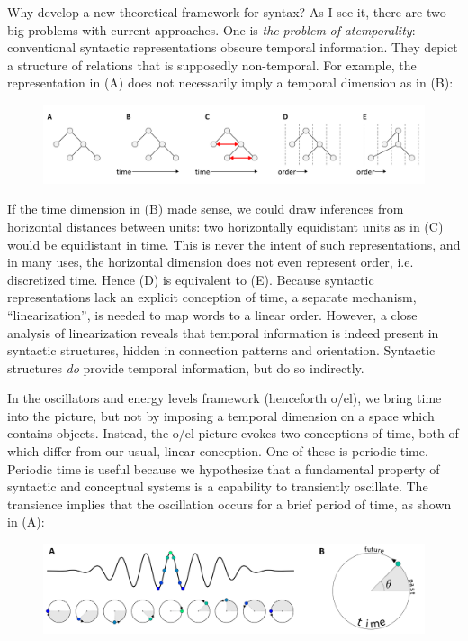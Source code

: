 Why develop a new theoretical framework for syntax? As I see it, there are two big problems with current approaches. One is \textit{the} \textit{problem} \textit{of} \textit{atemporality}: conventional syntactic representations obscure temporal information. They depict a structure of relations that is supposedly non-temporal. For example, the representation in (A) does not necessarily imply a temporal dimension as in (B): 

  
\begin{figure}
\includegraphics[width=\textwidth]{figures/Tilsen-img1.png}
\caption{\missingcaption}
\label{fig:}
\end{figure}
 

  If the time dimension in (B) made sense, we could draw inferences from horizontal distances between units: two horizontally equidistant units as in (C) would be equidistant in time. This is never the intent of such representations, and in many uses, the horizontal dimension does not even represent order, i.e. discretized time. Hence (D) is equivalent to (E). Because syntactic representations lack an explicit conception of time, a separate mechanism, “linearization”, is needed to map words to a linear order.  However, a close analysis of linearization reveals that temporal information is indeed present in syntactic structures, hidden in connection patterns and orientation. Syntactic structures \textit{do} provide temporal information, but do so indirectly.

  In the oscillators and energy levels framework (henceforth o/el), we bring time into the picture, but not by imposing a temporal dimension on a space which contains objects. Instead, the o/el picture evokes two conceptions of time, both of which differ from our usual, linear conception. One of these is periodic time. Periodic time is useful because we hypothesize that a fundamental property of syntactic and conceptual systems is a capability to transiently oscillate. The transience implies that the oscillation occurs for a brief period of time, as shown in (A): 

  
\begin{figure}
\includegraphics[width=\textwidth]{figures/Tilsen-img2.png}
\caption{\missingcaption}
\label{fig:}
\end{figure}
 


